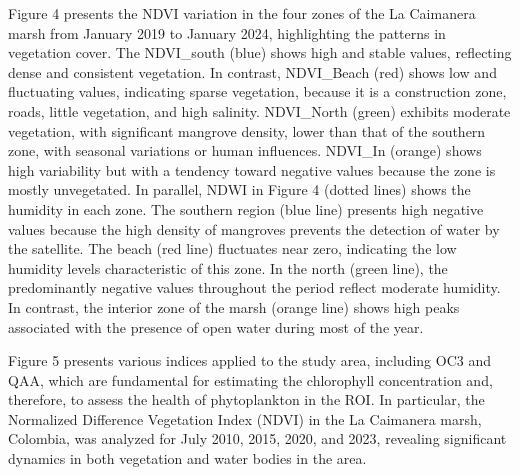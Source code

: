 \documentclass[10pt,a4paper,twocolumn]{article}
\begin{document}
Figure 4 presents the NDVI variation in the four zones of the La Caimanera marsh from January 2019 to January 2024, highlighting the patterns in vegetation cover. The NDVI\_south (blue) shows high and stable values, reflecting dense and consistent vegetation. In contrast, NDVI\_Beach (red) shows low and fluctuating values, indicating sparse vegetation, because it is a construction zone, roads, little vegetation, and high salinity. NDVI\_North (green) exhibits moderate vegetation, with significant mangrove density, lower than that of the southern zone, with seasonal variations or human influences. NDVI\_In (orange) shows high variability but with a tendency toward negative values because the zone is mostly unvegetated. In parallel, NDWI in Figure 4 (dotted lines) shows the humidity in each zone. The southern region (blue line) presents high negative values because the high density of mangroves prevents the detection of water by the satellite. The beach (red line) fluctuates near zero, indicating the low humidity levels characteristic of this zone. In the north (green line), the predominantly negative values throughout the period reflect moderate humidity. In contrast, the interior zone of the marsh (orange line) shows high peaks associated with the presence of open water during most of the year.

Figure 5 presents various indices applied to the study area, including OC3 and QAA, which are fundamental for estimating the chlorophyll concentration and, therefore, to assess the health of phytoplankton in the ROI. In particular, the Normalized Difference Vegetation Index (NDVI) in the La Caimanera marsh, Colombia, was analyzed for July 2010, 2015, 2020, and 2023, revealing significant dynamics in both vegetation and water bodies in the area.
\end{document}
